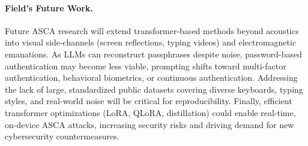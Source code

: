 \paragraph{Field's Future Work.}
Future ASCA research will extend transformer-based methods beyond acoustics into visual side-channels (screen reflections, typing videos) and electromagnetic emanations. As LLMs can reconstruct passphrases despite noise, password-based authentication may become less viable, prompting shifts toward multi-factor authentication, behavioral biometrics, or continuous authentication. Addressing the lack of large, standardized public datasets covering diverse keyboards, typing styles, and real-world noise will be critical for reproducibility. Finally, efficient transformer optimizations (LoRA, QLoRA, distillation) could enable real-time, on-device ASCA attacks, increasing security risks and driving demand for new cybersecurity countermeasures.

